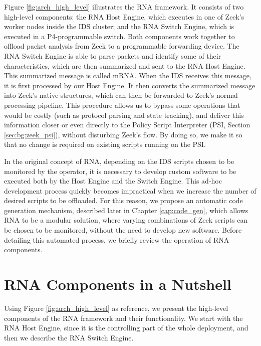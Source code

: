 Figure \ref{fig:arch_high_level} illustrates the RNA framework. It consists of two high-level components: the RNA Host Engine, which executes in one of Zeek's worker nodes inside the IDS cluster; and the RNA Switch Engine, which is executed in a P4-programmable switch. Both components work together to offload packet analysis from Zeek to a programmable forwarding device. The RNA Switch Engine is able to parse packets and identify some of their characteristics, which are then summarized and sent to the RNA Host Engine. This summarized message is called mRNA. When the IDS receives this message, it is first processed by our Host Engine. It then converts the summarized message into Zeek's native structures, which can then be forwarded to Zeek's normal processing pipeline. This procedure allows us to bypass some operations that would be costly (such as protocol parsing and state tracking), and deliver this information closer or even directly to the Policy Script Interpreter (PSI, Section \ref{sec:bg:zeek_psi}), without disturbing Zeek's flow. By doing so, we make it so that no change is required on existing scripts running on the PSI.

In the original concept of RNA, depending on the IDS scripts chosen to be monitored by the operator, it is necessary to develop custom software to be executed both by the Host Engine and the Switch Engine. This ad-hoc development process quickly becomes impractical when we increase the number of desired scripts to be offloaded. For this reason, we propose an automatic code generation mechanism, described later in Chapter \ref{cap:code_gen}, which allows RNA to be a modular solution, where varying combinations of Zeek scripts can be chosen to be monitored, without the need to develop new software. Before detailing this automated process, we briefly review the operation of RNA components.

\section{RNA Components in a Nutshell}
\label{sec:rna:overview}

Using Figure \ref{fig:arch_high_level} as reference, we present the high-level components of the RNA framework and their functionality. We start with the RNA Host Engine, since it is the controlling part of the whole deployment, and then we describe the RNA Switch Engine.

